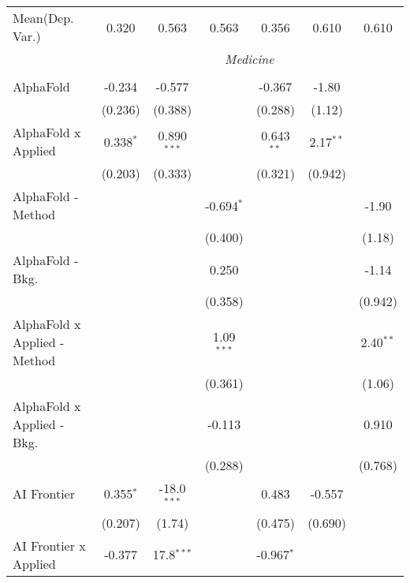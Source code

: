 \begin{tabular}{lcccccc}
Mean(Dep. Var.) & 0.320 & 0.563 & 0.563 & 0.356 & 0.610 & 0.610 \\
 & \multicolumn{6}{c}{\textit{Medicine}} \\ \\
   AlphaFold                      & -0.234         & -0.577        &               & -0.367         & -1.80        &   \\   
                                  & (0.236)        & (0.388)       &               & (0.288)        & (1.12)       &   \\   
   AlphaFold x Applied            & 0.338$^{*}$    & 0.890$^{***}$ &               & 0.643$^{**}$   & 2.17$^{**}$  &   \\   
                                  & (0.203)        & (0.333)       &               & (0.321)        & (0.942)      &   \\   
   AlphaFold - Method             &                &               & -0.694$^{*}$  &                &              & -1.90\\   
                                  &                &               & (0.400)       &                &              & (1.18)\\   
   AlphaFold - Bkg.               &                &               & 0.250         &                &              & -1.14\\   
                                  &                &               & (0.358)       &                &              & (0.942)\\   
   AlphaFold x Applied - Method   &                &               & 1.09$^{***}$  &                &              & 2.40$^{**}$\\   
                                  &                &               & (0.361)       &                &              & (1.06)\\   
   AlphaFold x Applied - Bkg.     &                &               & -0.113        &                &              & 0.910\\   
                                  &                &               & (0.288)       &                &              & (0.768)\\   
   AI Frontier                    & 0.355$^{*}$    & -18.0$^{***}$ &               & 0.483          & -0.557       &   \\   
                                  & (0.207)        & (1.74)        &               & (0.475)        & (0.690)      &   \\   
   AI Frontier x Applied          & -0.377         & 17.8$^{***}$  &               & -0.967$^{*}$   &              &   \\   

\end{tabular}
